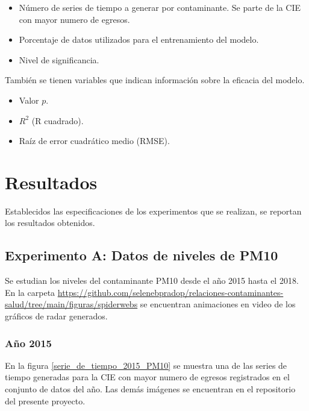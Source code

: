 \begin{itemize}
	\item Número de series de tiempo a generar por contaminante. Se parte de la CIE \citep{r9} con mayor numero de egresos.
	\item Porcentaje de datos utilizados para el entrenamiento del modelo.
	\item Nivel de significancia.
\end{itemize}

También se tienen variables que indican información sobre la eficacia del modelo.

\begin{itemize}
	\item Valor $p$.
	\item $R^2$ (R cuadrado).
	\item Raíz de error cuadrático medio (RMSE).
\end{itemize}


\section{Resultados}
Establecidos las especificaciones de los experimentos que se realizan, se reportan los resultados obtenidos.

\subsection{Experimento A: Datos de niveles de PM10}
Se estudian los niveles del contaminante PM10 desde el año 2015 hasta el 2018. En la carpeta \url{https://github.com/selenebpradop/relaciones-contaminantes-salud/tree/main/figuras/spiderwebs} se encuentran animaciones en video de los gráficos de radar generados.

\subsubsection{Año 2015}
En la figura \ref{serie_de_tiempo_2015_PM10} se muestra una de las series de tiempo generadas para la CIE \citep{r9} con mayor numero de egresos registrados en el conjunto de datos del año. Las demás imágenes se encuentran en el repositorio del presente proyecto.

